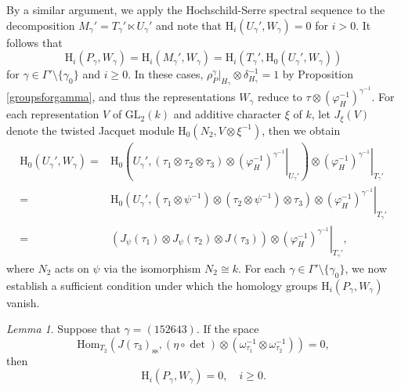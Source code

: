 \documentclass[12pt]{amsart}
\newcommand{\RH}{{\mathrm {H}}}
\newcommand{\GL}{{\mathrm{GL}}}
\newcommand{\Hom}{{\mathrm{Hom}}}
\theoremstyle{Theorem}
\theoremstyle{Theorem}
\theoremstyle{Theorem}
\theoremstyle{Theorem}
\theoremstyle{Plain}
\theoremstyle{remark}
\theoremstyle{remark}
\theoremstyle{Definition}
\newtheorem{lemd}[dfn]{Lemma}
\begin{document}
By a similar argument, we apply the Hochschild-Serre spectral sequence to the decomposition $ M_\gamma' = T_\gamma' \ltimes U_\gamma' $ and note that $ \RH_i \left( U_\gamma', W_\gamma \right) = 0 $ for $ i > 0 $. It follows that 
\[
    \RH_i \left( P_\gamma, W_\gamma \right) = \RH_i \left( M_\gamma', W_\gamma \right) = \RH_i \left( T_\gamma', \RH_0 ( U_\gamma', W_\gamma ) \right)
\]
for $ \gamma \in \Gamma' \setminus \{ \gamma_0 \} $ and $ i \ge 0 $. In these cases, $ \rho_P^{ \gamma }|_{ H_\gamma } \otimes \delta^{-1}_{ H_\gamma } = 1 $ by Proposition \ref{groupsforgamma}, and thus the representations $W_\gamma$ reduce to $ \tau \otimes \left( \varphi_H^{-1} \right)^{ \gamma^{-1} } $. For each representation $V$ of $\GL_2(k)$ and additive character $\xi$ of $k$, let $J_{\xi}(V)$ denote the twisted Jacquet module $ \RH_0 ( N_2, V \otimes \xi^{-1} ) $, then we obtain
\[
    \begin{aligned}
        \RH_0 \left( U_\gamma', W_\gamma \right)
        =& \RH_0 \left( U_\gamma', ( \tau_1 \otimes \tau_2 \otimes \tau_3 ) \otimes \left. \left( \varphi_H^{-1} \right)^{ \gamma^{-1} } \right|_{U_\gamma'} \right) \otimes \left. \left( \varphi_H^{-1} \right)^{ \gamma^{-1} } \right|_{T_\gamma'}\\
        =& \RH_0 \left( U_\gamma', \left( \tau_1 \otimes \psi^{-1} \right) \otimes \left( \tau_2 \otimes \psi^{-1} \right) \otimes \tau_3 \right) \otimes \left. \left( \varphi_H^{-1} \right)^{ \gamma^{-1} } \right|_{T_\gamma'}                                       \\
        =& \left( J_\psi ( \tau_1 ) \otimes J_\psi ( \tau_2 ) \otimes J ( \tau_3 ) \right) \otimes \left. \left( \varphi_H^{-1} \right)^{ \gamma^{-1} } \right|_{T_\gamma'},
    \end{aligned}
\]
where $N_2$ acts on $\psi$ via the isomorphism $ N_2 \cong k $.
For each $ \gamma \in \Gamma' \setminus \{ \gamma_0 \} $, we now establish a sufficient condition under which the homology groups $\RH_i \left( P_\gamma, W_\gamma \right) $ vanish.

\begin{lemd}
    Suppose that $ \gamma = (152643) $. If the space
    \[
        \Hom_{T_2}
        \left(
            J( \tau_3 )_\mathrm{ss}, ( \eta \circ \det ) \otimes \left( \omega_{ \tau_1 }^{-1} \otimes \omega_{ \tau_2 }^{-1} \right)
        \right)=0,
    \]
    then 
    \[
        \RH_i \left( P_\gamma, W_\gamma \right) = 0, \quad i \ge 0.
    \]
\end{lemd}
\end{document}
